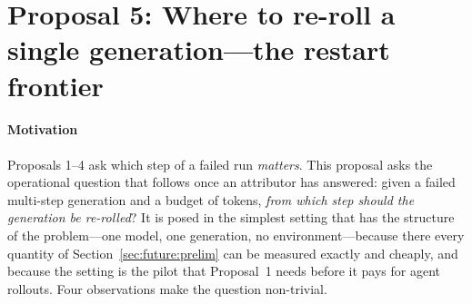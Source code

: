\section{Proposal 5: Where to re-roll a single generation---the restart frontier}\label{sec:future:reroll}

\paragraph{Motivation} Proposals 1--4 ask which step of a failed run \emph{matters}. This proposal asks the operational question that follows once an attributor has answered: given a failed multi-step generation and a budget of tokens, \emph{from which step should the generation be re-rolled}? It is posed in the simplest setting that has the structure of the problem---one model, one generation, no environment---because there every quantity of Section~\ref{sec:future:prelim} can be measured exactly and cheaply, and because the setting is the pilot that Proposal~1 needs before it pays for agent rollouts. Four observations make the question non-trivial.
